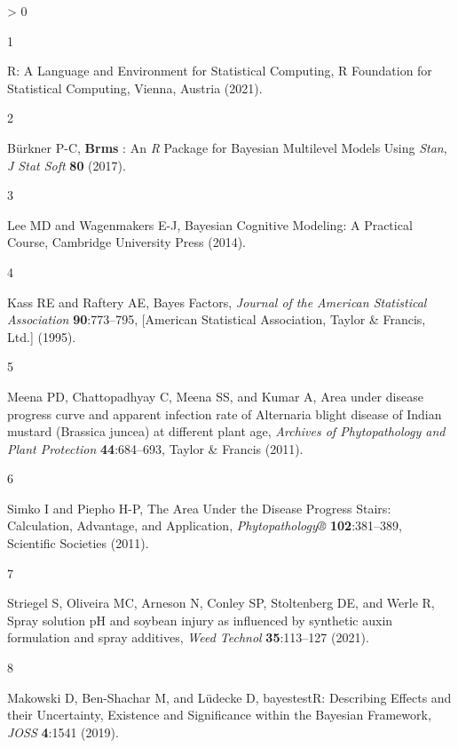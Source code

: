\documentclass[
  12pt,
  a4paper,
]{article}
\newlength{\cslhangindent}
\newlength{\csllabelwidth}
\newenvironment{CSLReferences}[2] %
 {%
  \setlength{\parindent}{0pt}
  \ifodd #1 \everypar{\setlength{\hangindent}{\cslhangindent}}\ignorespaces\fi
  \ifnum #2 > 0
  \setlength{\parskip}{#2\baselineskip}
  \fi
 }%
 {}
\newcommand{\CSLLeftMargin}[1]{\parbox[t]{\csllabelwidth}{#1}}
\newcommand{\CSLRightInline}[1]{\parbox[t]{\linewidth - \csllabelwidth}{#1}\break}
\begin{document}
\hypertarget{refs}{}
\begin{CSLReferences}{1}{0}
\leavevmode\hypertarget{ref-LanguageEnvironmentStatistical2021}{}%
\CSLLeftMargin{1 }
\CSLRightInline{R: {A Language} and {Environment} for {Statistical
Computing}, {R Foundation for Statistical Computing}, {Vienna, Austria}
(2021).}

\leavevmode\hypertarget{ref-burknerBrmsPackageBayesian2017}{}%
\CSLLeftMargin{2 }
\CSLRightInline{Bürkner P-C, \textbf{Brms} : {An} {\emph{R}} {Package}
for {Bayesian Multilevel Models Using} {\emph{Stan}}, \emph{J Stat Soft}
\textbf{80} (2017).}

\leavevmode\hypertarget{ref-leeBayesianCognitiveModeling2014}{}%
\CSLLeftMargin{3 }
\CSLRightInline{Lee MD and Wagenmakers E-J, Bayesian {Cognitive
Modeling}: {A Practical Course}, {Cambridge University Press} (2014).}

\leavevmode\hypertarget{ref-kassBayesFactors1995}{}%
\CSLLeftMargin{4 }
\CSLRightInline{Kass RE and Raftery AE, Bayes {Factors}, \emph{Journal
of the American Statistical Association} \textbf{90}:773--795,
{{[}American Statistical Association, Taylor \& Francis, Ltd.{]}}
(1995).}

\leavevmode\hypertarget{ref-meenaAreaDiseaseProgress2011}{}%
\CSLLeftMargin{5 }
\CSLRightInline{Meena PD, Chattopadhyay C, Meena SS, and Kumar A, Area
under disease progress curve and apparent infection rate of {Alternaria}
blight disease of {Indian} mustard ({Brassica} juncea) at different
plant age, \emph{Archives of Phytopathology and Plant Protection}
\textbf{44}:684--693, {Taylor \& Francis} (2011).}

\leavevmode\hypertarget{ref-simkoAreaDiseaseProgress2011}{}%
\CSLLeftMargin{6 }
\CSLRightInline{Simko I and Piepho H-P, The {Area Under} the {Disease
Progress Stairs}: {Calculation}, {Advantage}, and {Application},
\emph{Phytopathology®} \textbf{102}:381--389, {Scientific Societies}
(2011).}

\leavevmode\hypertarget{ref-striegelSpraySolutionPH2021}{}%
\CSLLeftMargin{7 }
\CSLRightInline{Striegel S, Oliveira MC, Arneson N, Conley SP,
Stoltenberg DE, and Werle R, Spray solution {pH} and soybean injury as
influenced by synthetic auxin formulation and spray additives,
\emph{Weed Technol} \textbf{35}:113--127 (2021).}

\leavevmode\hypertarget{ref-makowski2019}{}%
\CSLLeftMargin{8 }
\CSLRightInline{Makowski D, Ben-Shachar M, and Lüdecke D, {bayestestR}:
{Describing Effects} and their {Uncertainty}, {Existence} and
{Significance} within the {Bayesian Framework}, \emph{JOSS}
\textbf{4}:1541 (2019).}

\end{CSLReferences}
\end{document}
